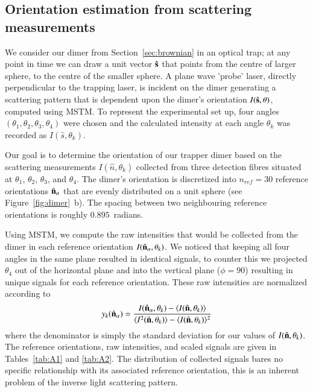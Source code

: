 \documentclass[final,  3p]{elsarticle}
\begin{document}
\subsection{Orientation estimation from scattering measurements}
\label{sec:Bayes}

We consider our dimer from Section~\ref{sec:brownian} in an optical
trap; at any point in time we can draw a unit vector $\hat{\bf s}$
that points from the centre of larger sphere, to the centre of the
smaller sphere.  A plane wave 'probe' laser, directly perpendicular to
the trapping laser, is incident on the dimer generating a scattering
pattern that is dependent upon the dimer's orientation
$I(\hat{\bf s}, \theta)$, computed using MSTM. To represent the
experimental set up, four angles
$(\theta_1, \theta_2, \theta_3, \theta_4)$ were chosen and the
calculated intensity at each angle $\theta_k$ was recorded as
$I(\hat{s}, \theta_k)$.

Our goal is to determine the orientation of our trapper dimer based on
the scattering measurements $I(\hat{n}, \theta_k)$ collected from
three detection fibres situated at $\theta_1$, $\theta_2$, $\theta_3$,
and $\theta_4$.  The dimer's orientation is discretized into
$n_{ref}=30$ reference orientations $\hat{\bf n}_{\alpha}$ that are
evenly distributed on a unit sphere \cite{Rey2006} (see
Figure~\ref{fig:dimer}~b).  The spacing between two neighbouring
reference orientations is roughly $0.895$~radians.

Using MSTM, we compute the raw intensities that would be collected
from the dimer in each reference orientation
$I(\hat{\bf n}_{\alpha}, \theta_k)$. We noticed that keeping all four
angles in the same plane resulted in identical signals, to counter
this we projected $\theta_4$ out of the horizontal plane and into the
vertical plane ($\phi = 90$) resulting in unique signals for each
reference orientation.
%
These raw intensities are normalized according to
\begin{align}
\label{eq:scale}
  y_k(\hat{\bf n}_\alpha)
  = 
  \frac{I(\hat{\bf n}_\alpha, \theta_k) - \langle I(\hat{\bf n},\theta_k) \rangle } 
  {\langle I^2(\hat{\bf n},\theta_k) \rangle -\langle I(\hat{\bf n}, \theta_k)\rangle^2}
\end{align}
where the denominator is simply the standard deviation for our values
of $I(\hat{\bf n}, \theta_k)$.  The reference orientations, raw
intensities, and scaled signals are given in Tables~\ref{tab:A1} and
\ref{tab:A2}.  The distribution of collected signals bares no specific
relationship with its associated reference orientation, this is an
inherent problem of the inverse light scattering pattern.
\end{document}
